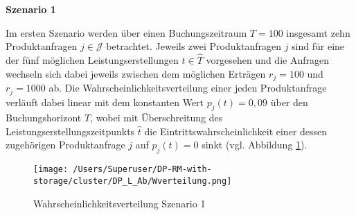 \textbf{Szenario 1}

Im ersten Szenario werden über einen Buchungszeitraum $T=100$ insgesamt zehn Produktanfragen $j\in\mathcal{J}$ betrachtet. Jeweils zwei Produktanfragen $j$ sind für eine der fünf möglichen Leistungserstellungen $\hat t\in\hat T$ vorgesehen und die Anfragen wechseln sich dabei jeweils zwischen dem möglichen Erträgen $r_j=100$ und $r_j=1000$ ab. Die Wahrscheinlichkeitsverteilung einer jeden Produktanfrage verläuft dabei linear mit dem konstanten Wert $p_j(t)=0,09$ über den Buchungshorizont $T$, wobei mit Überschreitung des Leistungserstellungszeitpunkts $\hat t$ die Eintrittswahrscheinlichkeit einer dessen zugehörigen Produktanfrage $j$ auf $p_j(t)=0$ sinkt (vgl. Abbildung \ref{SB1}).

\begin{figure}[h!]
  \begin{center}
    \texttt{[image: /Users/Superuser/DP-RM-with-storage/cluster/DP\_L\_Ab/Wverteilung.png]}
    \caption{Wahrscheinlichkeitsverteilung Szenario 1}  \label{SB1}
  \end{center}
\end{figure}

